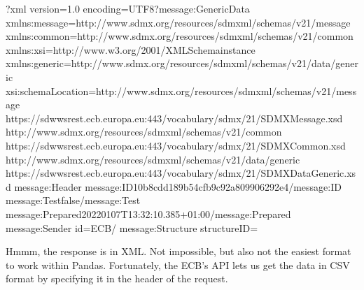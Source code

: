 \documentclass[letterpaper,10pt,english]{sphinxmanual}
\begin{document}
\begin{sphinxVerbatim}[commandchars=\\\{\}]
\PYGZlt{}?xml version=\PYGZdq{}1.0\PYGZdq{} encoding=\PYGZdq{}UTF\PYGZhy{}8\PYGZdq{}?\PYGZgt{}\PYGZlt{}message:GenericData xmlns:message=\PYGZdq{}http://www.sdmx.org/resources/sdmxml/schemas/v2\PYGZus{}1/message\PYGZdq{} xmlns:common=\PYGZdq{}http://www.sdmx.org/resources/sdmxml/schemas/v2\PYGZus{}1/common\PYGZdq{} xmlns:xsi=\PYGZdq{}http://www.w3.org/2001/XMLSchema\PYGZhy{}instance\PYGZdq{} xmlns:generic=\PYGZdq{}http://www.sdmx.org/resources/sdmxml/schemas/v2\PYGZus{}1/data/generic\PYGZdq{} xsi:schemaLocation=\PYGZdq{}http://www.sdmx.org/resources/sdmxml/schemas/v2\PYGZus{}1/message https://sdw\PYGZhy{}wsrest.ecb.europa.eu:443/vocabulary/sdmx/2\PYGZus{}1/SDMXMessage.xsd http://www.sdmx.org/resources/sdmxml/schemas/v2\PYGZus{}1/common https://sdw\PYGZhy{}wsrest.ecb.europa.eu:443/vocabulary/sdmx/2\PYGZus{}1/SDMXCommon.xsd http://www.sdmx.org/resources/sdmxml/schemas/v2\PYGZus{}1/data/generic https://sdw\PYGZhy{}wsrest.ecb.europa.eu:443/vocabulary/sdmx/2\PYGZus{}1/SDMXDataGeneric.xsd\PYGZdq{}\PYGZgt{}
\PYGZlt{}message:Header\PYGZgt{}
\PYGZlt{}message:ID\PYGZgt{}10b8cdd1\PYGZhy{}89b5\PYGZhy{}4cfb\PYGZhy{}9c92\PYGZhy{}a809906292e4\PYGZlt{}/message:ID\PYGZgt{}
\PYGZlt{}message:Test\PYGZgt{}false\PYGZlt{}/message:Test\PYGZgt{}
\PYGZlt{}message:Prepared\PYGZgt{}2022\PYGZhy{}01\PYGZhy{}07T13:32:10.385+01:00\PYGZlt{}/message:Prepared\PYGZgt{}
\PYGZlt{}message:Sender id=\PYGZdq{}ECB\PYGZdq{}/\PYGZgt{}
\PYGZlt{}message:Structure structureID=\PYGZdq{}
\end{sphinxVerbatim}

\sphinxAtStartPar
Hmmm, the response is in XML. Not impossible, but also not the easiest
format to work within Pandas. Fortunately, the ECB’s API lets us get the
data in CSV format by specifying it in the header of the request.
\end{document}
